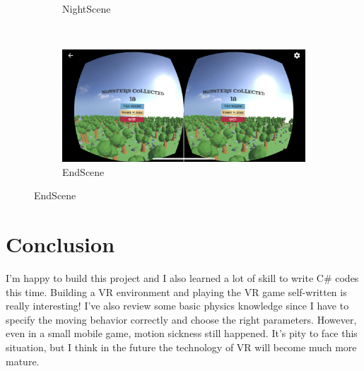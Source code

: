 \documentclass{article}
\begin{document}
\begin{figure}[!htb]
\begin{subfigure}[b]{0.49\textwidth}
        \caption{NightScene}
    \end{subfigure}
    ~
    \begin{subfigure}[b]{0.49\textwidth}
        \includegraphics[width=\textwidth]{Screenshots/EndScene.png}
        \caption{EndScene}
    \end{subfigure}
\end{figure}

\section*{Conclusion}

I'm happy to build this project and I also learned a lot of skill to write C\# codes this time. Building a VR environment and playing the VR game self-written is really interesting! I've also review some basic physics knowledge since I have to specify the moving behavior correctly and choose the right parameters. However, even in a small mobile game, motion sickness still happened. It's pity to face this situation, but I think in the future the technology of VR will become much more mature.
\end{document}

